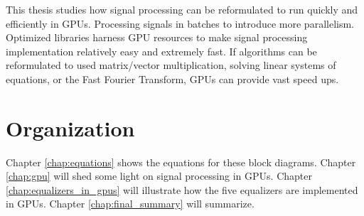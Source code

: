 This thesis studies how signal processing can be reformulated to run quickly and efficiently in GPUs.
Processing signals in batches to introduce more parallelism.
Optimized libraries harness GPU resources to make signal processing implementation relatively easy and extremely fast.
If algorithms can be reformulated to used matrix/vector multiplication, solving linear systems of equations, or the Fast Fourier Transform, GPUs can provide vast speed ups.

\section{Organization}
Chapter \ref{chap:equations} shows the equations for these block diagrams.
Chapter \ref{chap:gpu} will shed some light on signal processing in GPUs.
Chapter \ref{chap:equalizers_in_gpus} will illustrate how the five equalizers are implemented in GPUs.
Chapter \ref{chap:final_summary} will summarize.